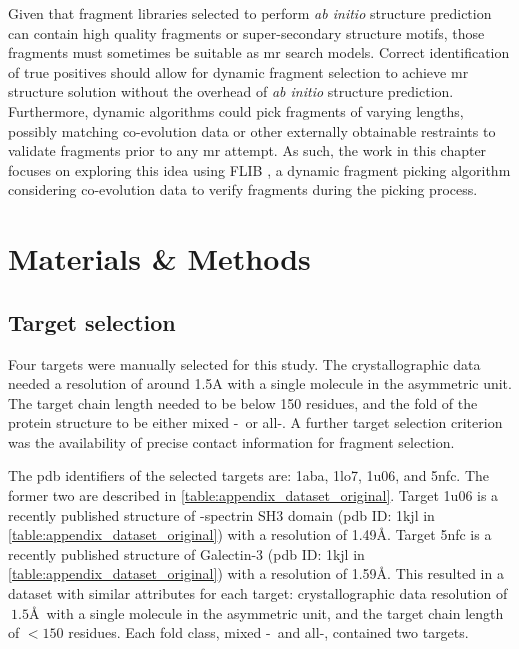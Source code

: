Given that fragment libraries selected to perform \textit{ab initio} structure prediction can contain high quality fragments or super-secondary structure motifs, those fragments must sometimes be suitable as \gls{mr} search models. Correct identification of true positives should allow for dynamic fragment selection to achieve \gls{mr} structure solution without the overhead of \textit{ab initio} structure prediction. Furthermore, dynamic algorithms could pick fragments of varying lengths, possibly matching co-evolution data or other externally obtainable restraints to validate fragments prior to any \gls{mr} attempt. As such, the work in this chapter focuses on exploring this idea using FLIB \cite{De_Oliveira2015-kb}, a dynamic fragment picking algorithm considering co-evolution data to verify fragments during the picking process.

\section{Materials \& Methods}
\subsection{Target selection}
Four targets were manually selected for this study. The crystallographic data needed a resolution of around 1.5A with a single molecule in the asymmetric unit. The target chain length needed to be below 150 residues, and the fold of the protein structure to be either mixed \textalpha-\textbeta\ or all-\textbeta. A further target selection criterion was the availability of precise contact information for fragment selection.

The \gls{pdb} identifiers of the selected targets are: 1aba, 1lo7, 1u06, and 5nfc. The former two are described in \cref{table:appendix_dataset_original}. Target 1u06 is a recently published structure of \textalpha-spectrin SH3 domain (\gls{pdb} ID: 1kjl in \cref{table:appendix_dataset_original}) with a resolution of 1.49\AA. Target 5nfc is a recently published structure of Galectin-3 (\gls{pdb} ID: 1kjl in \cref{table:appendix_dataset_original}) with a resolution of 1.59\AA. This resulted in a dataset with similar attributes for each target: crystallographic data resolution of $~1.5$\AA\ with a single molecule in the asymmetric unit, and the target chain length of $<150$ residues. Each fold class, mixed \textalpha-\textbeta\ and all-\textbeta, contained two targets.

